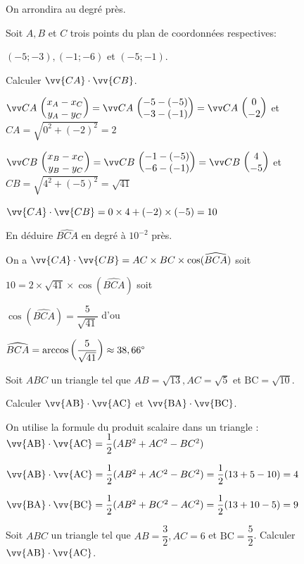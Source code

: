 \documentclass[11pt,a4paper]{article}  %
\begin{document}
On arrondira au degré près.

\exercice{}

Soit $A, B$ et $C$ trois points du plan de coordonnées respectives:

$(-5 ;-3),(-1 ;-6)$ et $(-5 ;-1)$.
\begin{enumMet}
	\item Calculer $\vv{C A} \cdot \vv{C B}$.
	\begin{corrBox}
		$\Coord{CA}{x_A-x_C}{y_A-y_C}=\Coord{CA}{-5-(-5)}{-3-(-1)}=\Coord{CA}{0}{-2}$ et $CA=\sqrt{0^2+(-2)^2}=2$
		
		$ \Coord{CB}{x_B-x_C}{y_B-y_C}=\Coord{CB}{-1-(-5)}{-6-(-1)}=\Coord{CB}{4}{-5} $ et $CB=\sqrt{4^2+(-5)^2}=\sqrt{41}$
		
		$\vv{CA} \cdot \vv{CB}=0\times 4+(-2)\times (-5)=10$			
	\end{corrBox}
	\item En déduire $\widehat{B C A}$ en degré à $10^{-2}$ près.
	\begin{corrBox}
		On a $\vv{CA} \cdot \vv{CB}=AC\times BC\times \cos(\widehat{BCA})$ soit
		
		$10=2\times \sqrt{41}\times \cos(\widehat{BCA})$ soit
		
		$\cos(\widehat{BCA})=\dfrac{5}{\sqrt{41}}$ d'ou
		
		$\widehat{BCA}=\arccos\left(\dfrac{5}{\sqrt{41}}\right)\approx38,66\degree$		
	\end{corrBox}
\end{enumMet}

\exercice{}

Soit $A B C$ un triangle tel que $A B=\sqrt{13}, A C=\sqrt{5}$ et $\mathrm{BC}=\sqrt{10}$. 

Calculer $\vv{\mathrm{AB}} \cdot \vv{\mathrm{AC}}$ et $\vv{\mathrm{BA}} \cdot \vv{\mathrm{BC}}$.

\begin{corrBox}
	On utilise la formule du produit scalaire dans un triangle : $\vv{\mathrm{AB}} \cdot \vv{\mathrm{AC}}=\dfrac{1}{2}(AB^2+AC^2-BC^2)$
	
	$\vv{\mathrm{AB}} \cdot \vv{\mathrm{AC}}=\dfrac{1}{2}(AB^2+AC^2-BC^2)=\dfrac{1}{2}(13+5-10)=4$
	
	$\vv{\mathrm{BA}} \cdot \vv{\mathrm{BC}}=\dfrac{1}{2}(AB^2+BC^2-AC^2)=\dfrac{1}{2}(13+10-5)=9$
\end{corrBox}

\exercice{}

Soit $A B C$ un triangle tel que $A B=\dfrac{3}{2}, A C=6$ et $\mathrm{BC}=\dfrac{5}{2}$. Calculer $\vv{\mathrm{AB}} \cdot \vv{\mathrm{AC}}$.
\end{document}
